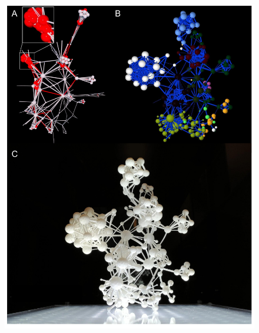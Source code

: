 \documentclass[nofootinbib,preprint,floatfix,titlepage,superscriptaddress]{revtex4} %
\begin{document}
\begin{figure}
    \centering
    \vspace{-2cm}
    \includegraphics[height=\textheight]{fig-09-19/3D-flavor-111917-2-2.pdf}
\end{figure}
\end{document}
